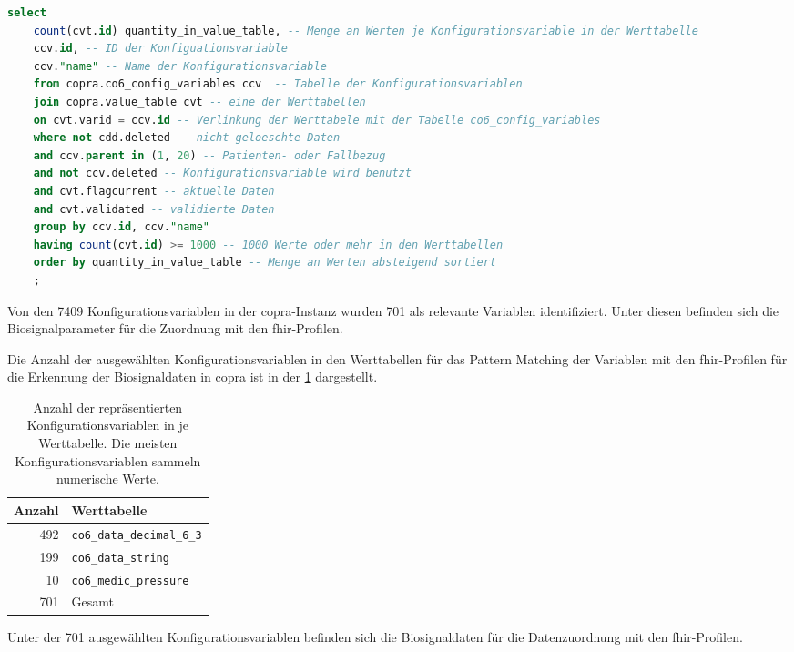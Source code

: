 \begin{lstlisting}[language=SQL, caption={[SQL-Abfrage zur Auswahl der Konfigurationsvariablen] SQL-Abfrage zur Auswahl der Konfigurationsvariablen im COPRA-System. \glqq copra.value\_table cvt\grqq{} stellt die verschiedenen Werttabellen im System dar: co6\_data\_decimal\_6\_3, co6\_data\_string und co6\_medic\_pressure. \glqq quantity\_in\_value\_table\grqq{} ist ein Alias für die Spalte der Menge an Werten in den Werttabellen.}, captionpos=b, label=list:selectconfigvar]
	select 
	count(cvt.id) quantity_in_value_table, -- Menge an Werten je Konfigurationsvariable in der Werttabelle
	ccv.id, -- ID der Konfiguationsvariable
	ccv."name" -- Name der Konfigurationsvariable
	from copra.co6_config_variables ccv  -- Tabelle der Konfigurationsvariablen 
	join copra.value_table cvt -- eine der Werttabellen
	on cvt.varid = ccv.id -- Verlinkung der Werttabele mit der Tabelle co6_config_variables
	where not cdd.deleted -- nicht geloeschte Daten
	and ccv.parent in (1, 20) -- Patienten- oder Fallbezug
	and not ccv.deleted -- Konfigurationsvariable wird benutzt
	and cvt.flagcurrent -- aktuelle Daten
	and cvt.validated -- validierte Daten
	group by ccv.id, ccv."name" 
	having count(cvt.id) >= 1000 -- 1000 Werte oder mehr in den Werttabellen
	order by quantity_in_value_table -- Menge an Werten absteigend sortiert
	;
\end{lstlisting}

Von den 7409 Konfigurationsvariablen in der \ac{copra}-Instanz wurden 701 als relevante Variablen identifiziert. Unter diesen befinden sich die Biosignalparameter für die Zuordnung mit den \ac{fhir}-Profilen.

Die Anzahl der ausgewählten Konfigurationsvariablen in den Werttabellen für das Pattern Matching der Variablen mit den \ac{fhir}-Profilen für die Erkennung der Biosignaldaten in \ac{copra} ist in der \ref{tab:configvarvaluetables} dargestellt.

\begin{table}[ht]
	\centering  
	\caption[Anzahl der repräsentierten Konfigurationsvariablen in je Werttabelle]{Anzahl der repräsentierten Konfigurationsvariablen in je Werttabelle. Die meisten Konfigurationsvariablen sammeln numerische Werte.}
	
	\label{tab:configvarvaluetables}
	\begin{tabular}{|r|l|}
		\hline
		\bfseries Anzahl & \bfseries Werttabelle \\ \hline
		492 & \texttt{co6\_data\_decimal\_6\_3} \\ \hline
		199 & \texttt{co6\_data\_string} \\ \hline
		10 & \texttt{co6\_medic\_pressure} \\ \hline
		701 & Gesamt \\ \hline 
	\end{tabular}
\end{table}

Unter der 701 ausgewählten Konfigurationsvariablen befinden sich die Biosignaldaten für die Datenzuordnung mit den \ac{fhir}-Profilen.